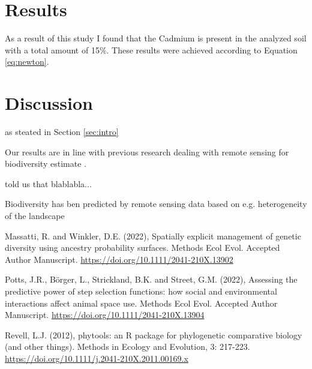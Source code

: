 \documentclass[a4paper,12pt]{article}
\begin{document}
\section{Results}
As a result of this study I found that the Cadmium is present in the analyzed soil with a total amount of 15\%. These results were achieved according to Equation \ref{eq:newton}.

 

\section{Discussion}
as steated in Section \ref{sec:intro}



Our results are in line with previous research dealing with remote sensing for biodiversity estimate \citep{Revell_2012, Potts_2022}. 

\citet{Revell_2012} told us  that blablabla...

Biodiversity has ben predicted by remote sensing data based on e.g. heterogeneity of the landscape \citep{Massatti_2022}


\begin{thebibliography}{999}

Massatti, R. and Winkler, D.E. (2022), Spatially explicit management of genetic diversity using ancestry probability surfaces. Methods Ecol Evol. Accepted Author Manuscript. \url{https://doi.org/10.1111/2041-210X.13902}

Potts, J.R., Börger, L., Strickland, B.K. and Street, G.M. (2022), Assessing the predictive power of step selection functions: how social and environmental interactions affect animal space use. Methods Ecol Evol. Accepted Author Manuscript. \url{https://doi.org/10.1111/2041-210X.13904}

Revell, L.J. (2012), phytools: an R package for phylogenetic comparative biology (and other things). Methods in Ecology and Evolution, 3: 217-223. \url{https://doi.org/10.1111/j.2041-210X.2011.00169.x}

\end{thebibliography}

\end{document}
